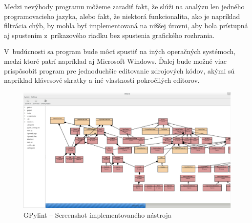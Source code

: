 \documentclass[11pt,oneside,final]{fithesis2}
\begin{document}
	Medzi nevýhody programu môžeme zaradiť fakt, že slúži na analýzu len jedného programovacieho jazyka, alebo fakt, že niektorá funkcionalita, ako je napríklad filtrácia chýb, by mohla byť implementovaná na nižšej úrovni, aby bola prístupná aj spustením z~príkazového riadku bez spustenia grafického rozhrania.
	
	V~budúcnosti sa program bude môcť spustiť na iných operačných systémoch, medzi ktoré patrí napríklad aj Microsoft Windows. Ďalej bude možné viac prispôsobiť program pre jednoduchšie editovanie zdrojových kódov, akými sú napríklad klávesové skratky a iné vlastnosti pokročilých editorov.
	
	\begin{figure}[htb]
	 \centering
	 \includegraphics[width=\textwidth]{images/gpylint}
	 \caption{GPylint -- Screenshot implementovaného nástroja}
	\end{figure}
	
\end{document}
